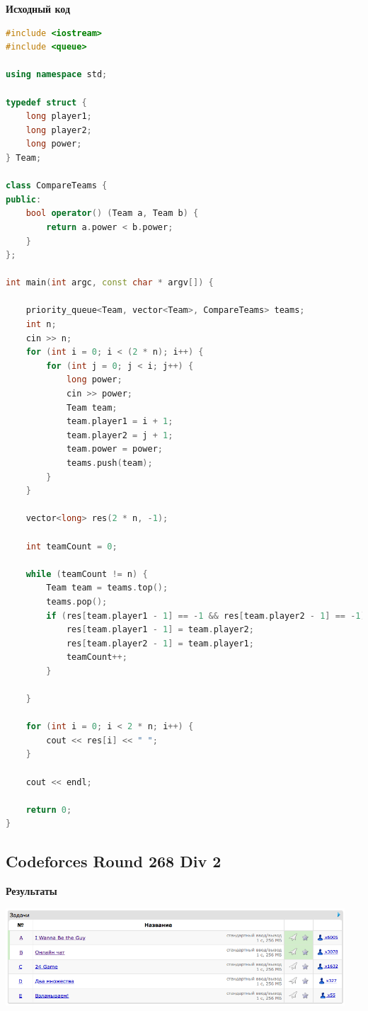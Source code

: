 \documentclass[a4paper,12pt]{article}
\begin{document}
\newpage
\textbf{{\large Исходный код}} \\
\begin{lstlisting}[language=C++]
#include <iostream>
#include <queue>

using namespace std;

typedef struct {
    long player1;
    long player2;
    long power;
} Team;

class CompareTeams {
public:
    bool operator() (Team a, Team b) {
        return a.power < b.power;
    }
};

int main(int argc, const char * argv[]) {
    
    priority_queue<Team, vector<Team>, CompareTeams> teams;
    int n;
    cin >> n;
    for (int i = 0; i < (2 * n); i++) {
        for (int j = 0; j < i; j++) {
            long power;
            cin >> power;
            Team team;
            team.player1 = i + 1;
            team.player2 = j + 1;
            team.power = power;
            teams.push(team);
        }
    }
    
    vector<long> res(2 * n, -1);
    
    int teamCount = 0;
    
    while (teamCount != n) {
        Team team = teams.top();
        teams.pop();
        if (res[team.player1 - 1] == -1 && res[team.player2 - 1] == -1) {
            res[team.player1 - 1] = team.player2;
            res[team.player2 - 1] = team.player1;
            teamCount++;
        }
        
    }
    
    for (int i = 0; i < 2 * n; i++) {
        cout << res[i] << " ";
    }
    
    cout << endl;
    
    return 0;
}
\end{lstlisting}



%
%

\newpage
\subsection{Codeforces Round 268 Div 2}

\textbf{{\large Результаты}} \\
\begin{center}
\includegraphics[width=0.95\textwidth]{C_268/C_268_result.png}\\ [1cm]
\end{center}
\end{document}
